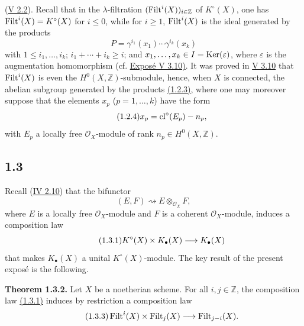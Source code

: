 (\hyperlink{sga6.e05.ex.2-2}{V 2.2}). Recall that in the $\lambda$-filtration
$(\operatorname{Filt}^i(X))_{i\in\mathbb Z}$ of $K^\circ(X)$, one has
$\operatorname{Filt}^i(X)=K^\circ(X)$ for $i\leq0$, while for $i\geq1$, $\operatorname{Filt}^i(X)$ is
the ideal generated by the products
\begin{equation}\tag{1.2.3}
P=\gamma^{i_1}(x_1)\cdots\gamma^{i_k}(x_k)
\end{equation}
with $1\leq i_1,\ldots,i_k$; $i_1+\cdots+i_k\geq i$; and
$x_1,\ldots,x_k\in I=\operatorname{Ker}(\varepsilon)$, where $\varepsilon$ is the
augmentation homomorphism (cf. \hyperlink{sga6.e05.para.3-10}{Expos\'e V 3.10)}. It was proved in \hyperlink{sga6.e05.para.3-10}{V 3.10} that
$\operatorname{Filt}^i(X)$ is even the $H^0(X,\mathbb Z)$-submodule, hence, when $X$ is
connected, the abelian subgroup generated by the products \hyperlink{sga6.e10.eq.1-2-3}{(1.2.3)}, where one
may moreover suppose that the elements $x_p$ ($p=1,\ldots,k$) have the form
\begin{equation}\tag{1.2.4}
x_p=\operatorname{cl}^\circ(E_p)-n_p,
\end{equation}
with $E_p$ a locally free $\mathcal O_X$-module of rank
$n_p\in H^0(X,\mathbb Z)$.

\subsection*{1.3}
Recall (\hyperlink{sga6.e04.para.2-10}{IV 2.10}) that the bifunctor
\[
(E,F)\rightsquigarrow E\otimes_{\mathcal O_X}F,
\]
where $E$ is a locally free $\mathcal O_X$-module and $F$ is a coherent
$\mathcal O_X$-module, induces a composition law
\begin{equation}\tag{\sgaStableTargetInline{sga6.e10.eq.1-3-1}1.3.1}
K^\circ(X)\times K_\bullet(X)\longrightarrow K_\bullet(X)
\end{equation}
that makes $K_\bullet(X)$ a unital $K^\circ(X)$-module. The key result of the
present expos\'e is the following.

\textbf{Theorem 1.3.2.}
Let $X$ be a noetherian scheme. For all $i,j\in\mathbb Z$, the composition law
\hyperlink{sga6.e10.eq.1-3-1}{(1.3.1)} induces by restriction a composition law
\begin{equation}\tag{1.3.3}
\operatorname{Filt}^i(X)\times\operatorname{Filt}_j(X)\longrightarrow\operatorname{Filt}_{j-i}(X).
\end{equation}

